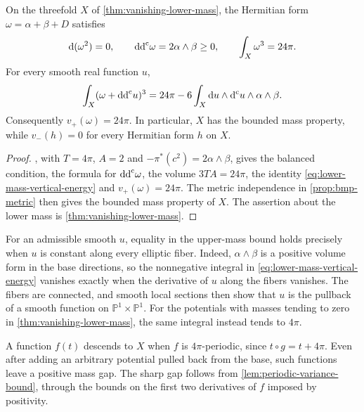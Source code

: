 \begin{corollary}\label{prop:lower-mass-balanced-metric}
On the threefold $X$ of \cref{thm:vanishing-lower-mass}, the Hermitian form $\omega=\alpha+\beta+D$ satisfies
\[
 \mathrm{d}(\omega^2)=0,\qquad \mathrm{dd}^{\mathrm{c}}\omega=2\alpha\wedge\beta\geq0,
 \qquad \int_X\omega^3=24\pi.
\]
For every smooth real function $u$,
\begin{equation}\label{eq:lower-mass-vertical-energy}
 \int_X(\omega+\mathrm{dd}^{\mathrm{c}} u)^3
 =24\pi-6\int_X\mathrm{d}u\wedge\mathrm d^{\mathrm c} u\wedge\alpha\wedge\beta.
\end{equation}
Consequently $v_+(\omega)=24\pi$. In particular, $X$ has the bounded mass property, while $v_-(h)=0$ for every Hermitian form $h$ on $X$.
\end{corollary}
\begin{proof}
, with $T=4\pi$, $A=2$ and $-\pi^*(c^2)=2\alpha\wedge\beta$, gives the balanced condition, the formula for $\mathrm{dd}^{\mathrm{c}}\omega$, the volume $3TA=24\pi$, the identity \eqref{eq:lower-mass-vertical-energy} and $v_+(\omega)=24\pi$. The metric independence in \cref{prop:bmp-metric} then gives the bounded mass property of $X$. The assertion about the lower mass is \cref{thm:vanishing-lower-mass}.
\end{proof}

For an admissible smooth $u$, equality in the upper-mass bound holds precisely when $u$ is constant along every elliptic fiber. Indeed, $\alpha\wedge\beta$ is a positive volume form in the base directions, so the nonnegative integral in \eqref{eq:lower-mass-vertical-energy} vanishes exactly when the derivative of $u$ along the fibers vanishes. The fibers are connected, and smooth local sections then show that $u$ is the pullback of a smooth function on $\mathbb P^1\times\mathbb P^1$. For the potentials with masses tending to zero in \cref{thm:vanishing-lower-mass}, the same integral instead tends to $4\pi$.

A function $f(t)$ descends to $X$ when $f$ is $4\pi$-periodic, since $t\circ g=t+4\pi$. Even after adding an arbitrary potential pulled back from the base, such functions leave a positive mass gap. The sharp gap follows from \cref{lem:periodic-variance-bound}, through the bounds on the first two derivatives of $f$ imposed by positivity.

